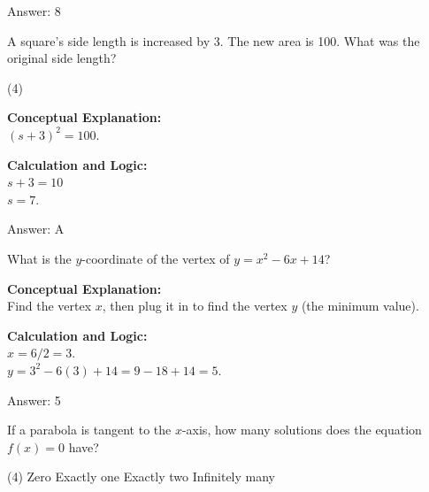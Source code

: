 \documentclass[11pt,paper=a4,answers]{exam}
\begin{document}
\begin{questions}
\begin{solution}
\vspace{25pt}

Answer: \colorbox{yellow!100}{8}
\end{solution}

\vspace{40pt}

\question
A square's side length is increased by 3. The new area is 100. What was the original side length?
\begin{tasks}(4)
\end{tasks}

\begin{solution}
\textbf{Conceptual Explanation:} \\
$(s+3)^2 = 100$.

\vspace{20pt}

\textbf{Calculation and Logic:} \\
$s + 3 = 10$ \\
$s = 7$.

\vspace{25pt}

Answer: \colorbox{yellow!100}{A}
\end{solution}

\vspace{40pt}

\question
What is the $y$-coordinate of the vertex of $y = x^2 - 6x + 14$?

\begin{solution}
\textbf{Conceptual Explanation:} \\
Find the vertex $x$, then plug it in to find the vertex $y$ (the minimum value).

\vspace{20pt}

\textbf{Calculation and Logic:} \\
$x = 6/2 = 3$. \\
$y = 3^2 - 6(3) + 14 = 9 - 18 + 14 = 5$.

\vspace{25pt}

Answer: \colorbox{yellow!100}{5}
\end{solution}

\vspace{40pt}

\question
If a parabola is tangent to the $x$-axis, how many solutions does the equation $f(x) = 0$ have?
\begin{tasks}(4)
    \task Zero
    \task Exactly one
    \task Exactly two
    \task Infinitely many
\end{tasks}


\end{questions}
\end{document}
